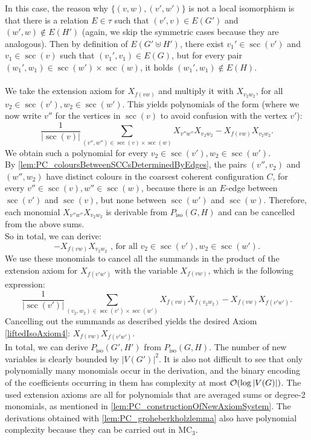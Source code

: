 \documentclass[a4paper,UKenglish,cleveref, autoref, thm-restate]{lipics-v2021}
\newcommand{\MC}{\textrm{MC}}
\newcommand{\Oo}{{\cal O}}
\newcommand{\scc}{{\operatorname{scc}}}
\newcommand{\Piso}{P_{\text{iso}}}
\begin{document}
In this case, the reason why $\{(v,w),(v',w')\}$ is not a local isomorphism is that there is a relation $E \in \tau$ such that $(v',v) \in E(G')$ and $(w',w) \notin E(H')$ (again, we skip the symmetric cases because they are analogous). Then by definition of $E(G' \uplus H')$, there exist $v_1' \in \scc(v')$ and $v_1 \in \scc(v)$ such that $(v_1',v_1) \in E(G)$, but for every pair $(w_1',w_1) \in \scc(w') \times \scc(w)$, it holds $(w_1',w_1) \notin E(H)$.\\
\\
We take the extension axiom for $X_{f(vw)}$ and multiply it with $X_{v_2w_2}$, for all $v_2 \in \scc(v'), w_2 \in \scc(w')$. This yields polynomials of the form (where we now write $v''$ for the vertices in $\scc(v)$ to avoid confusion with the vertex $v'$):
\[
\frac{1}{|\scc(v)|}\sum\limits_{(v'',w'') \in \scc(v) \times \scc(w)} X_{v''w''}X_{v_2w_2} - X_{f(vw)}X_{v_2w_2}. 
\]
We obtain such a polynomial for every $v_2 \in \scc(v'), w_2 \in \scc(w')$.\\
By \autoref{lem:PC_coloursBetweenSCCsDeterminedByEdges}, the pairs $(v'',v_2)$ and $(w'',w_2)$ have distinct colours in the coarsest coherent configuration $C$, for every $v'' \in \scc(v), w'' \in \scc(w)$, because there is an $E$-edge between $\scc(v')$ and $\scc(v)$, but none between $\scc(w')$ and $\scc(w)$. Therefore, each monomial $X_{v''w''}X_{v_2w_2}$ is derivable from $\Piso(G,H)$ and can be cancelled from the above sums.\\
So in total, we can derive: 
\[
- X_{f(vw)}X_{v_2w_2} \text{ , for all } v_2 \in \scc(v'), w_2 \in \scc(w').
\]
We use these monomials to cancel all the summands in the product of the extension axiom for $X_{f(v'w')}$ with the variable $X_{f(vw)}$, which is the following expression:
\[
\frac{1}{|\scc(v')|}\sum\limits_{(v_2,w_2) \in \scc(v') \times \scc(w')} X_{f(vw)}X_{f(v_2w_2)} - X_{f(vw)}X_{f(v'w')}.
\]
Cancelling out the summands as described yields the desired Axiom \eqref{liftedIsoAxiom4}: $X_{f(vw)}X_{f(v'w')}$.\\
	
In total, we can derive $\Piso(G',H')$ from $\Piso(G,H)$. The number of new variables is clearly bounded by $|V(G')|^2$. It is also not difficult to see that only polynomially many monomials occur in the derivation, and the binary encoding of the coefficients occurring in them has complexity at most $\Oo(\log |V(G)|)$. The used extension axioms are all for polynomials that are averaged sums or degree-2 monomials, as mentioned in \autoref{lem:PC_constructionOfNewAxiomSystem}.
The derivations obtained with \autoref{lem:PC_groheberkholzlemma} also have polynomial complexity because they can be carried out in $\MC_3$.
	
\end{document}

